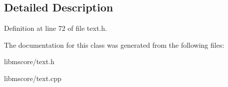 \subsection{Detailed Description}


Definition at line 72 of file text.\+h.



The documentation for this class was generated from the following files\+:\begin{DoxyCompactItemize}
\item 
libmscore/text.\+h\item 
libmscore/text.\+cpp\end{DoxyCompactItemize}
